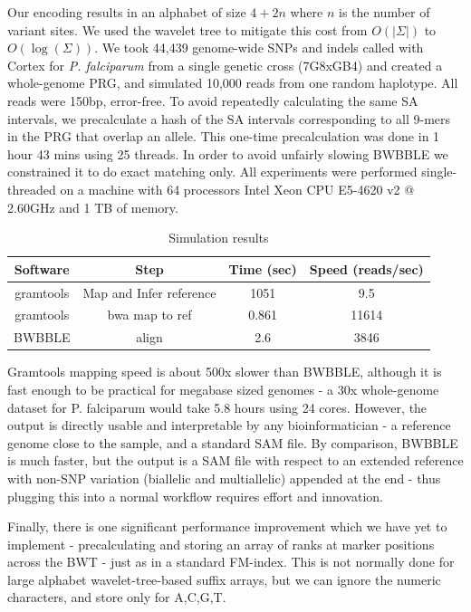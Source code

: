 \documentclass[runningheads,a4paper]{llncs}
\begin{document}
Our encoding results in an alphabet of size $4+2n$ where $n$ is the number of variant sites. We used the wavelet tree to mitigate this cost from $O(|\Sigma|)$ to $O(\log(\Sigma))$.
We  took 44,439 genome-wide SNPs and indels called with Cortex for \textit{P. falciparum} from a single genetic cross (7G8xGB4) \cite{miles} and created a whole-genome PRG, and simulated 10,000 reads from one random haplotype. All reads were 150bp, error-free. To avoid repeatedly calculating the same SA intervals, we precalculate a hash of the SA intervals corresponding to all 9-mers in the PRG that overlap an allele. This one-time precalculation was done in 1 hour 43 mins using 25 threads. In order to avoid unfairly slowing BWBBLE we constrained it to do exact matching only.  All experiments were performed single-threaded on a machine with 64 processors Intel Xeon CPU E5-4620 v2 @ 2.60GHz and 1 TB of memory.

\begin{table}
\caption{Simulation results }
\centering
\begin{tabular}{c c c c}
\hline
Software  & Step & Time (sec) & Speed (reads/sec)\\
\hline
gramtools & Map and Infer reference &  1051 & 9.5 \\
gramtools & bwa map to ref & 0.861  & 11614 \\
BWBBLE  & align & 2.6 & 3846 \\ 
\hline
\end{tabular}
\end{table}

Gramtools mapping speed is about 500x slower than BWBBLE, although it is fast enough to be practical for megabase sized genomes - a 30x whole-genome dataset for P. falciparum would take 5.8 hours using 24 cores. However, the output is directly usable and interpretable by any bioinformatician - a reference genome close to the sample, and a standard SAM file. By comparison, BWBBLE is much faster, but the output is a SAM file with respect to an extended reference with non-SNP variation (biallelic and multiallelic) appended at the end - thus plugging this into a normal workflow requires effort and innovation.

Finally, there is one significant performance improvement which we have yet to implement - precalculating and storing an array of ranks at marker positions across the BWT - just as in a standard FM-index. This is not normally done for large alphabet wavelet-tree-based suffix arrays, but we can ignore the numeric characters, and store only for A,C,G,T. 
\end{document}
